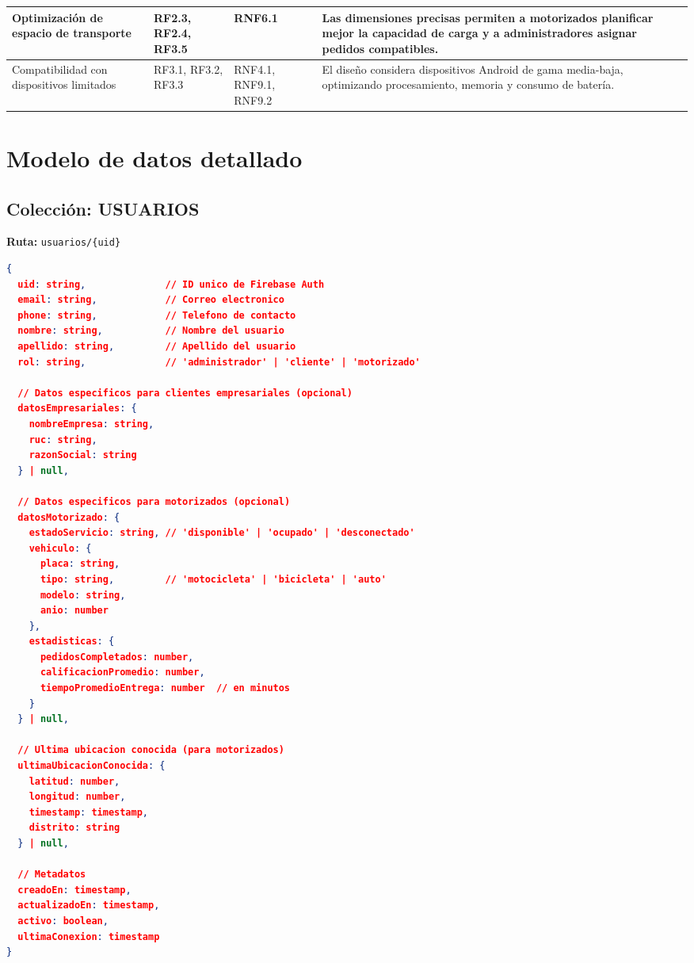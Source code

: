 \begin{longtable}{|p{3.5cm}|p{2.5cm}|p{2.5cm}|p{5.5cm}|}
Optimización de espacio de transporte & RF2.3, RF2.4, RF3.5 & RNF6.1 & Las dimensiones precisas permiten a motorizados planificar mejor la capacidad de carga y a administradores asignar pedidos compatibles. \\
\hline

Compatibilidad con dispositivos limitados & RF3.1, RF3.2, RF3.3 & RNF4.1, RNF9.1, RNF9.2 & El diseño considera dispositivos Android de gama media-baja, optimizando procesamiento, memoria y consumo de batería. \\
\hline

\end{longtable}

\chapter{Modelo de datos detallado}
\label{anexo:modelo-datos}

\section{Colección: USUARIOS}

\textbf{Ruta:} \texttt{usuarios/\{uid\}}

\begin{lstlisting}[language=json,caption={Estructura de documento Usuario}]
{
  uid: string,              // ID unico de Firebase Auth
  email: string,            // Correo electronico
  phone: string,            // Telefono de contacto
  nombre: string,           // Nombre del usuario
  apellido: string,         // Apellido del usuario
  rol: string,              // 'administrador' | 'cliente' | 'motorizado'
  
  // Datos especificos para clientes empresariales (opcional)
  datosEmpresariales: {
    nombreEmpresa: string,
    ruc: string,
    razonSocial: string
  } | null,
  
  // Datos especificos para motorizados (opcional)
  datosMotorizado: {
    estadoServicio: string, // 'disponible' | 'ocupado' | 'desconectado'
    vehiculo: {
      placa: string,
      tipo: string,         // 'motocicleta' | 'bicicleta' | 'auto'
      modelo: string,
      anio: number
    },
    estadisticas: {
      pedidosCompletados: number,
      calificacionPromedio: number,
      tiempoPromedioEntrega: number  // en minutos
    }
  } | null,
  
  // Ultima ubicacion conocida (para motorizados)
  ultimaUbicacionConocida: {
    latitud: number,
    longitud: number,
    timestamp: timestamp,
    distrito: string
  } | null,
  
  // Metadatos
  creadoEn: timestamp,
  actualizadoEn: timestamp,
  activo: boolean,
  ultimaConexion: timestamp
}
\end{lstlisting}


